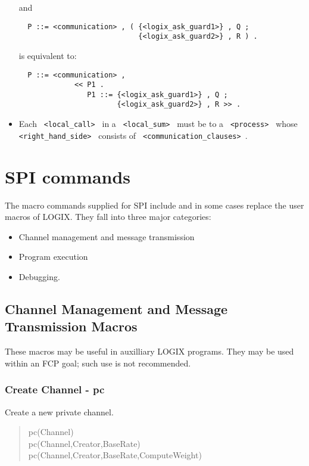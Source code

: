 \begin{itemize}
\noindent
and

\begin{verbatim}
  P ::= <communication> , ( {<logix_ask_guard1>} , Q ;
                            {<logix_ask_guard2>} , R ) .
\end{verbatim}

\noindent
is equivalent to:

\begin{verbatim}
  P ::= <communication> , 
             << P1 .
                P1 ::= {<logix_ask_guard1>} , Q ;
                       {<logix_ask_guard2>} , R >> .
\end{verbatim}


\item
Each \verb+ <local_call> + in a \verb+ <local_sum> + must be to a 
\verb+ <process> + whose \verb+ <right_hand_side> + consists of
\verb+ <communication_clauses> +.

\end{itemize}

\chapter{SPI commands}
\label{commands}

The macro commands supplied for SPI include and in some cases replace
the user macros of LOGIX.  They fall into three major
categories:

\begin{itemize}
\item Channel management and message transmission
\item Program execution
\item Debugging.
\end{itemize}

\section{Channel Management and Message Transmission Macros}

These macros may be useful in auxilliary LOGIX programs.
They may be used within an FCP goal; such use is not recommended.

\subsection{Create Channel - pc}

Create a new private channel.

\begin{verse}
pc(Channel) \\
pc(Channel,Creator,BaseRate) \\
pc(Channel,Creator,BaseRate,ComputeWeight)
\end{verse}

